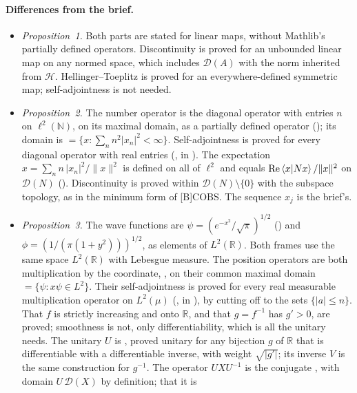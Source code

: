 \documentclass[11pt]{article}
\begin{document}
\paragraph{Differences from the brief.}
\begin{itemize}
\item \emph{Proposition~1.} Both parts are stated for linear maps, without Mathlib's partially
  defined operators. Discontinuity is proved for an unbounded linear map on any normed
  space, which includes $\mathcal{D}(A)$ with the norm inherited from $\mathcal{H}$.
  Hellinger--Toeplitz is proved for an everywhere-defined symmetric map; self-adjointness is
  not needed.
\item \emph{Proposition~2.} The number operator  is the diagonal operator
  with entries $n$ on $\ell^2(\mathbb{N})$, on its maximal domain, as a partially defined
  operator (); its domain is 
  $= \{x : \sum_n n^2|x_n|^2 < \infty\}$. Self-adjointness is proved for every diagonal
  operator with real entries (, in ). The expectation
  ~$x = \sum_n n\,|x_n|^2 / \|x\|^2$ is defined on all of $\ell^2$ and equals
  $\operatorname{Re}\braket{x|Nx}/\|x\|^2$ on $\mathcal{D}(N)$ ().
  Discontinuity is proved within $\mathcal{D}(N)\setminus\{0\}$ with the subspace topology,
  as in the minimum form of [B]COBS. The sequence $x_j$ is the brief's.
\item \emph{Proposition~3.} The wave functions are $\psi = (e^{-x^2}/\sqrt\pi)^{1/2}$
  () and $\phi = (1/(\pi(1+y^2)))^{1/2}$, as elements of
  $L^2(\mathbb{R})$. Both frames use the same space $L^2(\mathbb{R})$ with Lebesgue measure.
  The position operators are both multiplication by the coordinate, , on
  their common maximal domain  $= \{\psi : x\psi \in L^2\}$. Their
  self-adjointness is proved for every real measurable multiplication operator on $L^2(\mu)$
  (, in ), by cutting off to the sets
  $\{|a| \le n\}$. That $f$ is strictly increasing and onto
  $\mathbb{R}$, and that $g = f^{-1}$ has $g' > 0$, are proved; smoothness is not, only
  differentiability, which is all the unitary needs. The unitary $U$ is
  , proved unitary for any bijection $g$ of $\mathbb{R}$ that is
  differentiable with a differentiable inverse, with weight $\sqrt{|g'|}$; its inverse $V$ is
  the same construction for $g^{-1}$. The operator $UXU^{-1}$ is the conjugate
  , with domain $U\,\mathcal{D}(X)$ by definition; that it is

\end{itemize}
\end{document}
